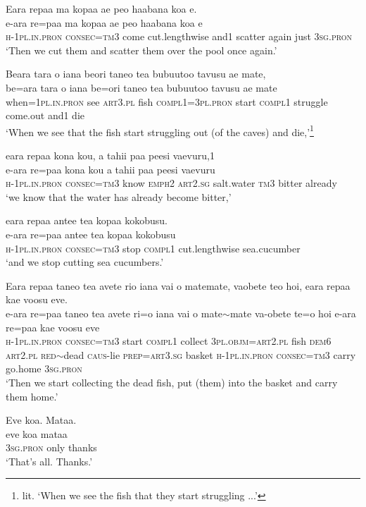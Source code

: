 \ea\label{ex:text31-9}
Eara repaa ma kopaa ae peo haabana koa e.\\
\gll e-ara	re=paa	ma	kopaa	ae	peo	haabana	koa	e\\
     \textsc{h}-1\textsc{pl}.\textsc{in}.\textsc{pron}	\textsc{consec}=\textsc{tm}3	come	cut.lengthwise	and1	scatter	again	just	3\textsc{sg}.\textsc{pron}\\
\glt `Then we cut them and scatter them over the pool once again.'
\z

\ea\label{ex:text31-10}
Beara tara o iana beori taneo tea bubuutoo tavusu ae mate,\\
\gll be=ara	tara	o	iana	be=ori	taneo	tea	bubuutoo	tavusu	ae	mate\\
     when=1\textsc{pl}.\textsc{in}.\textsc{pron}	see	\textsc{art}3.\textsc{pl}	fish	\textsc{compl}1=3\textsc{pl}.\textsc{pron}	start	\textsc{compl}1	struggle	come.out	and1	die\\
\glt `When we see that the fish start struggling out (of the caves) and die,'\footnote{lit. `When we see the fish that they start struggling ...'}
\z

\ea\label{ex:text31-11}
eara repaa kona kou, a tahii paa peesi vaevuru,1\\
\gll e-ara	re=paa	kona	kou	a	tahii	paa	peesi	vaevuru\\
     \textsc{h}-1\textsc{pl}.\textsc{in}.\textsc{pron}	\textsc{consec}=\textsc{tm}3	know	\textsc{emph}2	\textsc{art}2.\textsc{sg}	salt.water	\textsc{tm}3	bitter	already\\
\glt `we know that the water has already become bitter,'
\z

\ea\label{ex:text31-12}
eara repaa antee tea kopaa kokobusu.\\
\gll e-ara	re=paa	antee	tea	kopaa	kokobusu\\
     \textsc{h}-1\textsc{pl}.\textsc{in}.\textsc{pron}	\textsc{consec}=\textsc{tm}3	stop	\textsc{compl}1	cut.lengthwise	sea.cucumber\\
\glt `and we stop cutting sea cucumbers.'
\z

\ea\label{ex:text31-13}
Eara repaa taneo tea avete rio iana vai o matemate, vaobete teo hoi, eara repaa kae voosu eve.\\
\gll e-ara	re=paa	taneo	tea	avete	ri=o	iana	vai	o	mate{$\sim$}mate	va-obete	te=o	hoi	e-ara	re=paa	kae	voosu	eve\\
     \textsc{h}-1\textsc{pl}.\textsc{in}.\textsc{pron}	\textsc{consec}=\textsc{tm}3	start	\textsc{compl}1	collect	3\textsc{pl}.\textsc{objm}=\textsc{art}2.\textsc{pl}	fish	\textsc{dem}6	\textsc{art}2.\textsc{pl}	\textsc{red}{$\sim$}dead	\textsc{caus}-lie	\textsc{prep}=\textsc{art}3.\textsc{sg}	basket	\textsc{h}-1\textsc{pl}.\textsc{in}.\textsc{pron}	\textsc{consec}=\textsc{tm}3	carry	go.home	3\textsc{sg}.\textsc{pron}\\
\glt `Then we start collecting the dead fish, put (them) into the basket and carry them home.'
\z

\ea\label{ex:text31-14}
Eve koa. Mataa.\\
\gll eve	koa	mataa\\
     3\textsc{sg}.\textsc{pron}	only	thanks\\
\glt `That's all. Thanks.'
\z
